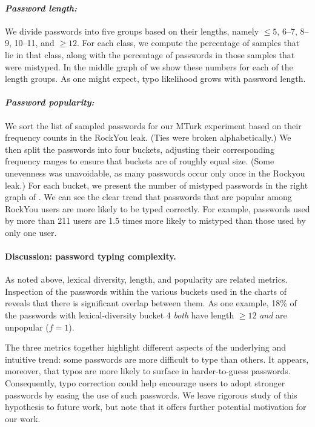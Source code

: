 \paragraph{\em Password length:}
We divide passwords into five groups based on their lengths, namely
$\le5$, 6--7, 8--9, 10--11, and $\ge12$. For each class, we compute
the percentage of samples that lie in that class, along with the
percentage of passwords in those samples that were mistyped.  In the
middle graph of  we show these numbers for
each of the length groups. As one might expect, typo likelihood grows with password length. 

\paragraph{\em Password popularity:} We sort the list of sampled
passwords for our MTurk experiment based on their frequency counts in
the RockYou leak. (Ties were broken alphabetically.) We then split the
passwords into four buckets, adjusting their corresponding frequency
ranges to ensure that buckets are of roughly equal size. (Some
unevenness was unavoidable, as many passwords occur only once in the
Rockyou leak.) For each bucket, we present the number of mistyped
passwords in the right graph of .  We can
see the clear trend that passwords that are popular among RockYou
users are more likely to be typed correctly.  For example, passwords
used by more than 211 users are 1.5 times more likely to mistyped than
those used by only one user.


\paragraph{Discussion: password typing complexity.}  As noted above,
lexical diversity, length, and popularity are related
metrics. Inspection of the passwords within the various buckets used
in the charts of  reveals that there is
significant overlap between them. As one example, 18\% of the
passwords with lexical-diversity bucket 4 {\em both} have length
$\ge 12$ {\em and} are unpopular ($f = 1$).

The three metrics together highlight different
aspects of the underlying and intuitive trend: some passwords are more
difficult to type than others. It appears, moreover, that typos are more likely to
surface in harder-to-guess passwords. Consequently, typo correction
could help encourage users to adopt stronger passwords by easing the
use of such passwords. We leave rigorous study
of this hypothesis to future work, but note that it offers further
potential motivation for our work.




